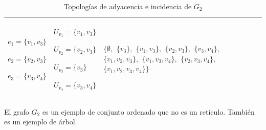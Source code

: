 \begin{table}[p]
\begin{tabular}{@{}>{\centering\arraybackslash}m{}>{\centering\arraybackslash}m{}>{\centering\arraybackslash}m{}@{}}
      \hline
         ${e_{1}=\{v_1,v_3\}}$\par
         ${e_{2}=\{v_2,v_3\}}$\par
         ${e_{3}=\{v_3,v_4\}}$
      &
         ${U_{v_1}=\{v_1,v_3\}}$\par
         ${U_{v_2}=\{v_2,v_3\}}$\par
         ${U_{v_3}=\{v_3\}}$\par
         ${U_{v_4}=\{v_3,v_4\}}$
      &
         $\{\emptyset,$ $\{v_3\},$ $\{v_1,v_3\},$ $\{v_2,v_3\},$ $\{v_3,v_4\},$ $\{v_1,v_2,v_3\},$ $\{v_1,v_3,v_4\},$ $\{v_2,v_3,v_4\},$ $\{v_1,v_2,v_3,v_4\}\}$ \\[6pt]
      \hline
   \end{tabular}
   \caption{Topologías de adyacencia e incidencia de $G_2$}
   \label{tab:topologias_G_2}

   \vspace{2em}
   \begin{minipage}{\textwidth}
      \normalsize
      El grafo $G_2$ es un ejemplo de conjunto ordenado que no es un retículo. También es un ejemplo de árbol.
   \end{minipage}
\end{table}
